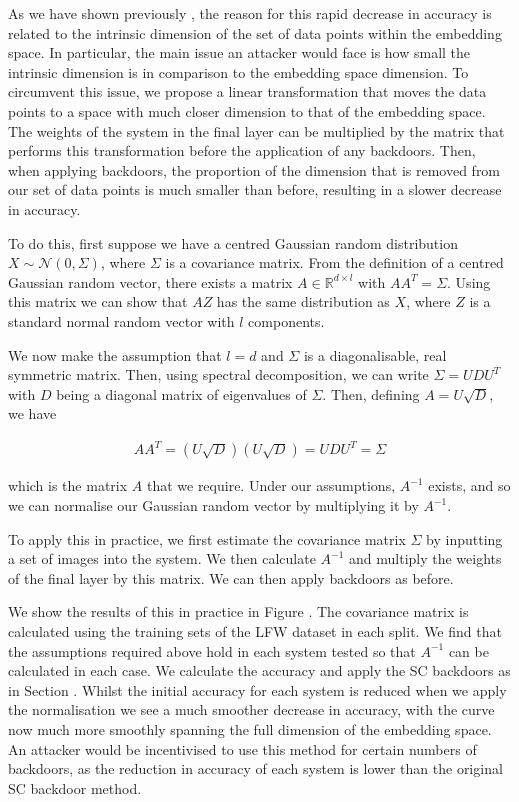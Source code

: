 \documentclass{article}
\theoremstyle{plain}
\theoremstyle{definition}
\theoremstyle{remark}
\begin{document}
As we have shown previously , the reason for this rapid decrease in accuracy is related to the intrinsic dimension of the set of data points within the embedding space. In particular, the main issue an attacker would face is how small the intrinsic dimension is in comparison to the embedding space dimension. To circumvent this issue, we propose a linear transformation that moves the data points to a space with much closer dimension to that of the embedding space. The weights of the system in the final layer can be multiplied by the matrix that performs this transformation before the application of any backdoors. Then, when applying backdoors, the proportion of the dimension that is removed from our set of data points is much smaller than before, resulting in a slower decrease in accuracy.

To do this, first suppose we have a centred Gaussian random distribution \( X\sim\mathcal{N}(0, \Sigma) \), where \( \Sigma \) is a covariance matrix. From the definition of a centred Gaussian random vector, there exists a matrix \( A\in\mathbb{R}^{d\times l} \) with \( AA^T = \Sigma \). Using this matrix we can show that \( AZ \)  has the same distribution as \( X \), where \( Z \) is a standard normal random vector with \( l \) components.

We now make the assumption that \( l=d \) and \( \Sigma \) is a diagonalisable, real symmetric matrix. Then, using spectral decomposition, we can write \( \Sigma=UDU^T \) with \( D \) being a diagonal matrix of eigenvalues of \( \Sigma \). Then, defining \( A=U\sqrt{D} \), we have

\begin{align}
    AA^T = (U\sqrt{D})(U\sqrt{D}) = UDU^T = \Sigma
\end{align}

which is the matrix \( A \) that we require. Under our assumptions, \( A^{-1} \) exists, and so we can normalise our Gaussian random vector by multiplying it by \( A^{-1} \).

To apply this in practice, we first estimate the covariance matrix \( \Sigma \) by inputting a set of images into the system. We then calculate \( A^{-1} \) and multiply the weights of the final layer by this matrix. We can then apply backdoors as before.

We show the results of this in practice in Figure . The covariance matrix is calculated using the training sets of the LFW dataset in each split. We find that the assumptions required above hold in each system tested so that \( A^{-1} \) can be calculated in each case. We calculate the accuracy and apply the SC backdoors as in Section . Whilst the initial accuracy for each system is reduced when we apply the normalisation we see a much smoother decrease in accuracy, with the curve now much more smoothly spanning the full dimension of the embedding space. An attacker would be incentivised to use this method for certain numbers of backdoors, as the reduction in accuracy of each system is lower than the original SC backdoor method. 
\end{document}
